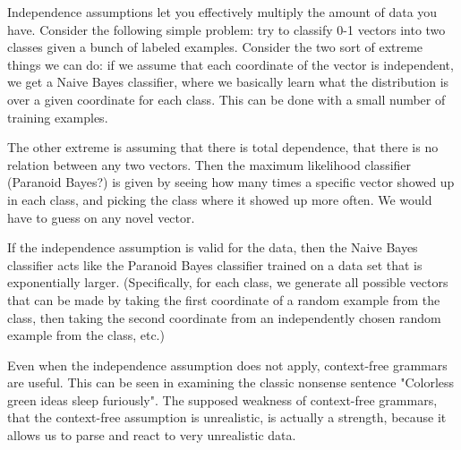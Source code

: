 \begin{rem}
  Independence assumptions let you effectively multiply the amount of
  data you have. Consider the following simple problem: try to
  classify 0-1 vectors into two classes given a bunch of labeled
  examples. Consider the two sort of extreme things we can do: if we
  assume that each coordinate of the vector is independent, we get a
  Naive Bayes classifier, where we basically learn what the
  distribution is over a given coordinate for each class. This can be
  done with a small number of training examples.

  The other extreme is assuming that there is total dependence, that
  there is no relation between any two vectors. Then the maximum
  likelihood classifier (Paranoid Bayes?) is given by seeing how many
  times a specific vector showed up in each class, and picking the
  class where it showed up more often. We would have to guess on any
  novel vector.  

  If the independence assumption is valid for the data, then the Naive
  Bayes classifier acts like the Paranoid Bayes classifier trained on
  a data set that is exponentially larger. (Specifically, for each
  class, we generate all possible vectors that can be made by taking
  the first coordinate of a random example from the class, then taking
  the second coordinate from an independently chosen random example
  from the class, etc.)
\end{rem}

Even when the independence assumption does not apply, context-free grammars
are useful. This can be seen in examining the classic nonsense
sentence "Colorless green ideas sleep furiously". The supposed
weakness of context-free grammars, that the context-free assumption is
unrealistic, is actually a strength, because it allows us to parse and
react to very unrealistic data.




